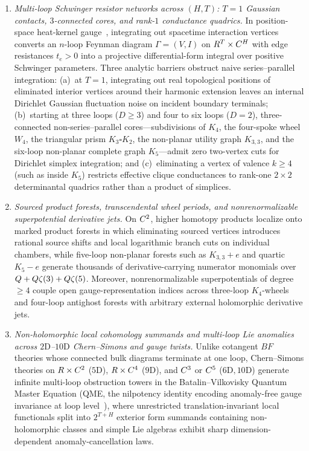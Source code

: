 \begin{enumerate}[label=(\arabic*),leftmargin=*]
  \item \emph{Multi-loop Schwinger resistor networks across $(H,T)$: $T=1$ Gaussian contacts, $3$-connected cores, and rank-$1$ conductance quadrics.} In position-space heat-kernel gauge~\cite{Costello,Mathews,WW24}, integrating out spacetime interaction vertices converts an $n$-loop Feynman diagram $\Gamma = (V,I)$ on $R^T \times C^H$ with edge resistances $t_e > 0$ into a projective differential-form integral over positive Schwinger parameters. Three analytic barriers obstruct naive series--parallel integration: (a)~at $T = 1$, integrating out real topological positions of eliminated interior vertices around their harmonic extension leaves an internal Dirichlet Gaussian fluctuation noise on incident boundary terminals; (b)~starting at three loops ($D \ge 3$) and four to six loops ($D = 2$), three-connected non-series--parallel cores---subdivisions of $K_4$, the four-spoke wheel $W_4$, the triangular prism $K_3 \square K_2$, the non-planar utility graph $K_{3,3}$, and the six-loop non-planar complete graph $K_5$---admit zero two-vertex cuts for Dirichlet simplex integration; and (c)~eliminating a vertex of valence $k \ge 4$ (such as inside $K_5$) restricts effective clique conductances to rank-one $2\times 2$ determinantal quadrics rather than a product of simplices.
  \item \emph{Sourced product forests, transcendental wheel periods, and nonrenormalizable superpotential derivative jets.} On $C^2$, higher homotopy products localize onto marked product forests in which eliminating sourced vertices introduces rational source shifts and local logarithmic branch cuts on individual chambers, while five-loop non-planar forests such as $K_{3,3}+e$ and quartic $K_5-e$ generate thousands of derivative-carrying numerator monomials over $Q + Q\zeta(3) + Q\zeta(5)$. Moreover, nonrenormalizable superpotentials of degree $\ge 4$ couple open gauge-representation indices across three-loop $K_4$-wheels and four-loop antighost forests with arbitrary external holomorphic derivative jets.
  \item \emph{Non-holomorphic local cohomology summands and multi-loop Lie anomalies across $2\mathrm{D}$--$10\mathrm{D}$ Chern--Simons and gauge twists.} Unlike cotangent $BF$ theories whose connected bulk diagrams terminate at one loop, Chern--Simons theories on $R \times C^2$ ($5\mathrm{D}$), $R \times C^4$ ($9\mathrm{D}$), and $C^3$ or $C^5$ ($6\mathrm{D}, 10\mathrm{D}$) generate infinite multi-loop obstruction towers in the Batalin--Vilkovisky Quantum Master Equation (QME, the nilpotency identity encoding anomaly-free gauge invariance at loop level~\cite{BBH,Costello}), where unrestricted translation-invariant local functionals split into $2^{T+H}$ exterior form summands containing non-holomorphic classes and simple Lie algebras exhibit sharp dimension-dependent anomaly-cancellation laws.

\end{enumerate}

